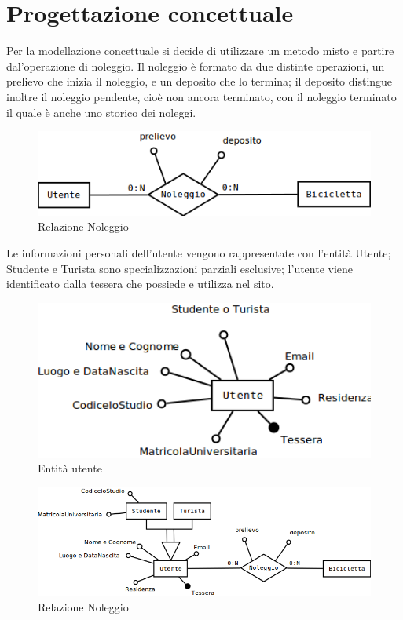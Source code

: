 \documentclass[a4paper,twoside]{article}
\begin{document}
\section{Progettazione concettuale}
Per la modellazione concettuale si decide di utilizzare un metodo misto e partire dal'operazione di noleggio.\newline
Il noleggio è formato da due distinte operazioni, un prelievo che inizia il noleggio, e un deposito che lo termina; il deposito distingue inoltre il noleggio pendente, cioè non ancora terminato, con il noleggio terminato il quale è anche uno storico dei noleggi.
\begin{figure}[H]
 \centering
  \includegraphics[width=1\textwidth]{Immagini-Grafici/Concettuale01.png}
\caption{Relazione Noleggio}
\end{figure}
Le informazioni personali dell'utente vengono rappresentate con l'entità Utente; Studente e Turista sono specializzazioni parziali esclusive; l'utente viene identificato dalla tessera che possiede e utilizza nel sito.
\begin{figure}[H]
 \centering
  \includegraphics[width=1\textwidth]{Immagini-Grafici/Concettuale02.png}
\caption{Entità utente}
\end{figure}
\begin{figure}[H]
 \centering
  \includegraphics[width=1\textwidth]{Immagini-Grafici/Concettuale03.png}
\caption{Relazione Noleggio}
\end{figure}
\end{document}
